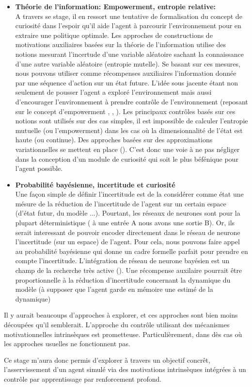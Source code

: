 \begin{itemize}
\item \textbf{Théorie de l'information: Empowerment, entropie relative:}\\
A travers se stage, il en ressort une tentative de formalisation du concept de curiosité dans l'espoir qu'il aide l'agent à parcourir l'environnement pour en extraire une politique optimale. Les approches de constructions de motivations auxiliaires basées sur la théorie de l'information utilise des notions mesurant l'incertude d'une variable aléatoire sachant la connaissance d'une autre variable aléatoire (entropie mutelle). Se basant sur ces mesures, nous pouvons utiliser comme récompenses auxiliaires l'information donnée par une séquence d'action sur un état future. L'idée sous jacente étant non seulement de pousser l'agent a exploré l'environnement mais aussi d'encourager l'environnement à prendre contrôle de l'environnement (reposant sur le concept d'empowerment \cite{empowerment}, \cite{empowerment2}, \cite{empowerment3}). Les principaux contrôles basés sur ces notions sont utilisés sur des cas simples, il est impossible de calculer l'entropie mutuelle (ou l'empowerment) dans les cas où la dimensionnalité de l'état est haute (ou continue). Des approches basées sur des approximations variationnelles se mettent en place (\cite{controleempowerment}). C'est donc une voie à ne pas négliger dans la conception d'un module de curiosité qui soit le plus béfénique pour l'agent possible. 
\item \textbf{Probabilité bayésienne, incertitude et curiosité}\\
Une façon simple de définir l'incertitude est de la considérer comme état une mésure de la réduction de l'incertitude de l'agent sur un certain espace (d'état futur, du modèle ...). Pourtant, les réseaux de neurones sont pour la plupart déterministique ( à une entrée A nous avons une sortie B). Or, ils serait interessant de pouvoir encoder directement dans le réseau de neurone l'incertitude (sur un espace) de l'agent. Pour cela, nous pouvons faire appel au probabilité bayésienne qui donne un cadre formelle parfait pour prendre en compte l'incertitude. L'intégration de réseau de neurone bayésien est un champ de la recherche très active (\cite{neuronebayes}). Une récompense auxilaire pourrait être proportionnelle à la réduction d'incertitude concernant la dynamique du modèle (à supposer que l'agent garde en mémoire une estimé de la dynamique) \cite{VIME}
\end{itemize}

Il y aurait beaucoups d'approches à explorer, et ces approches sont bien moins découpées qu'il semblerait. L'approche du contrôle utilisant des mécanismes motivationnelles intrinsèques est prometteuse. Particulièrement, dans dès cas où les approches usuelles ne fonctionnent pas. 

Ce stage m'aura donc permis d'explorer à travers un objectif concrêt, l'asservissement d'un agent simulé via des motivations intrinsèques intégrées à un contrôle par apprentissage par renforcement profond.

